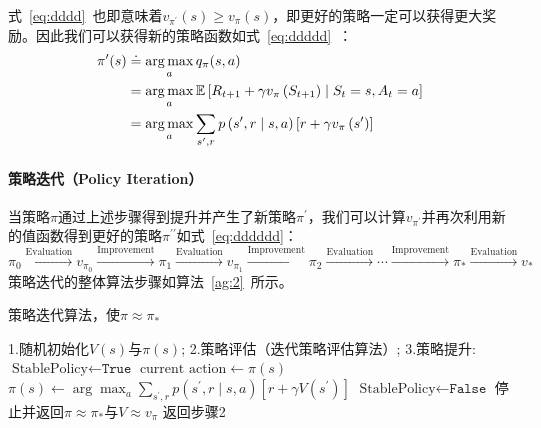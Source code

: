 式~\eqref{eq:dddd}~也即意味着$v_{\pi^{\prime}}(s) \geq v_{\pi}(s)$，即更好的策略一定可以获得更大奖励。因此我们可以获得新的策略函数如式~\eqref{eq:ddddd}~：
\begin{equation}
  \begin{aligned}
  \pi^{\prime}(s) & \doteq \operatorname*{\arg\max}_a q_{\pi}(s, a) \\
  &=\operatorname*{\arg\max}_a \mathbb{E}\left[R_{t+1}+\gamma v_{\pi}\left(S_{t+1}\right) \mid S_{t}=s, A_{t}=a\right] \\
  &=\operatorname*{\arg\max}_a \sum_{s^{\prime}, r} p\left(s^{\prime}, r \mid s, a\right)\left[r+\gamma v_{\pi}\left(s^{\prime}\right)\right]
  \end{aligned}
  \label{eq:ddddd}
\end{equation}

\paragraph{策略迭代（Policy Iteration）}
当策略$\pi$通过上述步骤得到提升并产生了新策略$\pi^{\prime}$，我们可以计算$v_{\pi^{\prime}}$并再次利用新的值函数得到更好的策略$\pi^{\prime\prime}$如式~\ref{eq:dddddd}：
\begin{equation}
  \pi_{0} \stackrel{\mathrm{Evaluation}}{\longrightarrow} v_{\pi_{0}} \stackrel{\mathrm{Improvement}}{\longrightarrow} \pi_{1} \stackrel{\mathrm{Evaluation}}{\longrightarrow} v_{\pi_{1}} \stackrel{\mathrm{Improvement}}{\longrightarrow} \pi_{2} \stackrel{\mathrm{Evaluation}}{\longrightarrow} \cdots \stackrel{\mathrm{Improvement}}{\longrightarrow} \pi_{*} \stackrel{\mathrm{Evaluation}}{\longrightarrow} v_{*}
  \label{eq:dddddd}
\end{equation}
策略迭代的整体算法步骤如算法~\ref{ag:2}~所示。
\begin{algorithm}[!t]
  \caption{策略迭代算法，使$\pi \approx \pi_{*} $}
  \begin{algorithmic}
    \State 1.随机初始化$V(s)$与$\pi(s)$;
    \State 2.策略评估（迭代策略评估算法）;
    \State 3.策略提升:
    \State $\text{StablePolicy} \leftarrow \texttt{True}$
    \State $\text{current action}\leftarrow\pi(s)$
    \State $\pi(s) \leftarrow \arg \max _{a} \sum_{s^{\prime}, r} p\left(s^{\prime}, r \mid s, a\right)\left[r+\gamma V\left(s^{\prime}\right)\right]$
        \State $\text{StablePolicy} \leftarrow \texttt{False}$
    \EndIf
    \EndFor
    \State 停止并返回$\pi \approx \pi_{*} $与$V\approx v_{\pi} $
    \Else 
    \State 返回步骤2
    \EndIf
  \end{algorithmic}
  \label{ag:2}
\end{algorithm}
